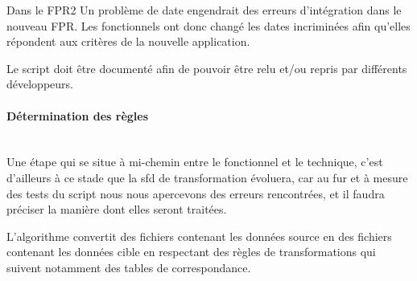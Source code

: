 \documentclass{book}
\newcommand{\myparagraph}[1]{\paragraph{#1}\mbox{}\\}
\begin{document}
\begin{bclogo}[arrondi = 0.1, couleur = blue!10, logo = \bcinfo]{Dans le FPR2}
Un problème de date engendrait des erreurs d'intégration dans le nouveau FPR. Les \gls{fonctionnels} ont donc changé les dates incriminées afin qu'elles répondent aux critères de la nouvelle application.
\end{bclogo}

Le script doit être documenté afin de pouvoir être relu et/ou repris par différents développeurs.

\myparagraph{Détermination des règles}

Une étape qui se situe à mi-chemin entre le fonctionnel et le technique, c'est d'ailleurs à ce stade que la \gls{sfd} de transformation évoluera, car au fur et à mesure des tests du script nous nous apercevons des erreurs rencontrées, et il faudra préciser la manière dont elles seront traitées.

L'algorithme convertit des fichiers contenant les données source en des fichiers contenant les données cible en respectant des règles de transformations qui suivent notamment des tables de correspondance.
\end{document}
